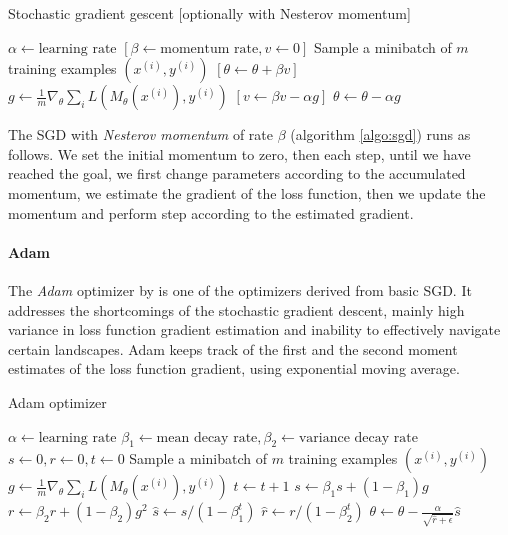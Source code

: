 \begin{algorithm}
\caption{Stochastic gradient gescent [optionally with Nesterov momentum]}
\label{algo:sgd}
\begin{algorithmic}
\STATE $\alpha \gets \text{learning rate}$
\STATE $\left[\beta \gets \text{momentum rate}, v \gets 0\right]$
\STATE
\REPEAT
\STATE Sample a minibatch of $m$ training examples $\left(x^{(i)}, y^{(i)}\right)$
\STATE $\left[\theta \gets \theta + \beta v\right]$
\STATE $g \gets \frac{1}{m} \nabla_\theta \sum_i L\left(M_\theta\left(x^{(i)}\right),y^{(i)}\right)$
\STATE $\left[v \gets \beta v - \alpha g\right]$
\STATE $\theta \gets \theta - \alpha g$
\end{algorithmic}
\end{algorithm}

\noindent The SGD with \emph{Nesterov momentum} of rate $\beta$ (algorithm \ref{algo:sgd}) runs as follows. We set the initial momentum to zero, then each step, until we have reached the goal, we first change parameters according to the accumulated momentum, we estimate the gradient of the loss function, then we update the momentum and perform step according to the estimated gradient.

\paragraph{Adam}
\label{sec:adam}

The \emph{Adam} optimizer by \cite{DBLP:journals/corr/KingmaB14} is one of the optimizers derived from basic SGD. It addresses the shortcomings of the stochastic gradient descent, mainly high variance in loss function gradient estimation and inability to effectively navigate certain landscapes. Adam keeps track of the first and the second moment estimates of the loss function gradient, using exponential moving average.

\begin{algorithm}
\caption{Adam optimizer}
\label{algo:adam}
\begin{algorithmic}
\STATE $\alpha \gets \text{learning rate}$
\STATE $\beta_1 \gets \text{mean decay rate}, \beta_2 \gets \text{variance decay rate}$
\STATE
\STATE $s \gets 0, r \gets 0, t \gets 0$
\REPEAT
\STATE Sample a minibatch of $m$ training examples $\left(x^{(i)}, y^{(i)}\right)$
\STATE $g \gets \frac{1}{m} \nabla_\theta \sum_i L\left(M_\theta\left(x^{(i)}\right),y^{(i)}\right)$
\STATE $t \gets t + 1$
\STATE $s \gets \beta_1 s + \left(1 - \beta_1\right)g$
\STATE $r \gets \beta_2 r + \left(1 - \beta_2\right)g^2$
\STATE $\hat{s} \gets s / \left(1 - \beta_1^t\right)$
\STATE $\hat{r} \gets r / \left(1 - \beta_2^t\right)$
\STATE $\theta \gets \theta - \frac{\alpha}{\sqrt{\hat{r} + \epsilon}} \hat{s}$
\end{algorithmic}
\end{algorithm}

